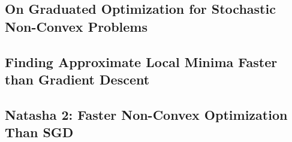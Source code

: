 \subsection{On Graduated Optimization for Stochastic Non-Convex Problems}


\subsection{Finding Approximate Local Minima Faster than Gradient Descent}


\subsection{Natasha 2: Faster Non-Convex Optimization Than SGD}

